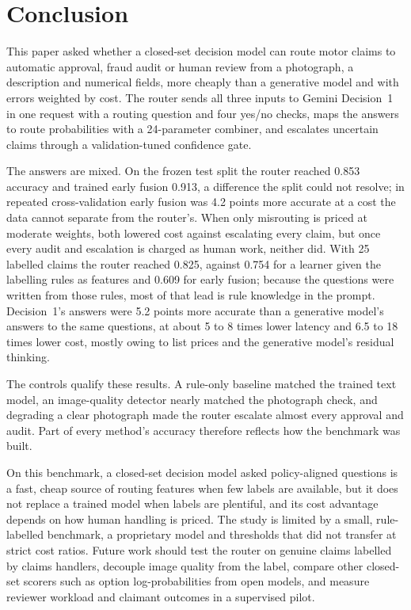 \section{Conclusion}\label{sec:conclusion}

This paper asked whether a closed-set decision model can route motor claims to automatic approval, fraud audit or human review from a photograph, a description and numerical fields, more cheaply than a generative model and with errors weighted by cost. The router sends all three inputs to Gemini Decision~1 in one request with a routing question and four yes/no checks, maps the answers to route probabilities with a 24-parameter combiner, and escalates uncertain claims through a validation-tuned confidence gate.

The answers are mixed. On the frozen test split the router reached 0.853 accuracy and trained early fusion 0.913, a difference the split could not resolve; in repeated cross-validation early fusion was 4.2 points more accurate at a cost the data cannot separate from the router's. When only misrouting is priced at moderate weights, both lowered cost against escalating every claim, but once every audit and escalation is charged as human work, neither did. With 25 labelled claims the router reached 0.825, against 0.754 for a learner given the labelling rules as features and 0.609 for early fusion; because the questions were written from those rules, most of that lead is rule knowledge in the prompt. Decision~1's answers were 5.2 points more accurate than a generative model's answers to the same questions, at about 5 to 8 times lower latency and 6.5 to 18 times lower cost, mostly owing to list prices and the generative model's residual thinking.

The controls qualify these results. A rule-only baseline matched the trained text model, an image-quality detector nearly matched the photograph check, and degrading a clear photograph made the router escalate almost every approval and audit. Part of every method's accuracy therefore reflects how the benchmark was built.

On this benchmark, a closed-set decision model asked policy-aligned questions is a fast, cheap source of routing features when few labels are available, but it does not replace a trained model when labels are plentiful, and its cost advantage depends on how human handling is priced. The study is limited by a small, rule-labelled benchmark, a proprietary model and thresholds that did not transfer at strict cost ratios. Future work should test the router on genuine claims labelled by claims handlers, decouple image quality from the label, compare other closed-set scorers such as option log-probabilities from open models, and measure reviewer workload and claimant outcomes in a supervised pilot.
